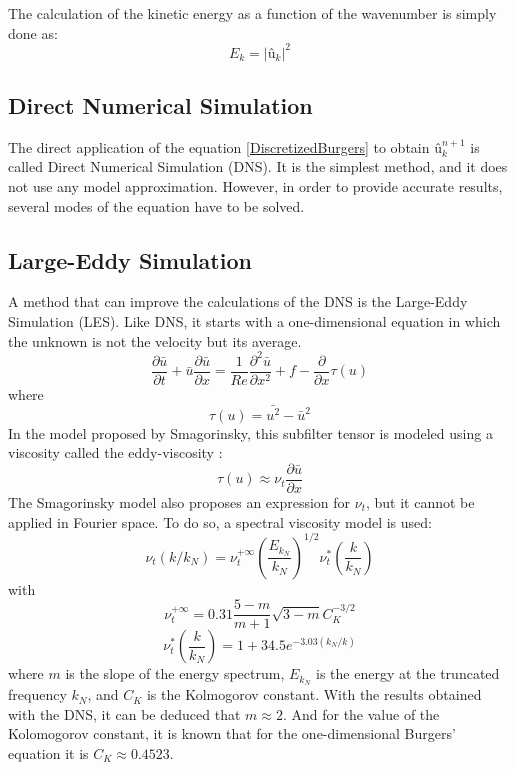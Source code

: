 The calculation of the kinetic energy as a function of the wavenumber is simply done as:
\begin{equation}
E_{k}=|û_{k}|^{2}
\end{equation}

\subsection{Direct Numerical Simulation}
The direct application of the equation \ref{DiscretizedBurgers} to obtain $û_{k}^{n+1}$ is called Direct Numerical Simulation (DNS). It is the simplest method, and it does not use any model approximation. However, in order to provide accurate results, several modes of the equation have to be solved.

\subsection{Large-Eddy Simulation}
A method that can improve the calculations of the DNS is the Large-Eddy Simulation (LES). Like DNS, it starts with a one-dimensional equation in which the unknown is not the velocity but its average.
\begin{equation}
\frac{\partial\bar{u}}{\partial t}+\bar{u}\frac{\partial\bar{u}}{\partial x}=\frac{1}{Re}\frac{\partial^{2}\bar{u}}{\partial x^{2}}+f-\frac{\partial}{\partial x}\tau\left(u\right)
\end{equation}
where
\begin{equation}
\tau\left(u\right)=\bar{u^{2}}-\bar{u}^{2}
\end{equation}
In the model proposed by Smagorinsky, this subfilter tensor is modeled using a viscosity called the eddy-viscosity \cite{CTTC2014}:
\begin{equation}
\tau\left(u\right)\approx\nu_{t}\frac{\partial\bar{u}}{\partial x}
\end{equation}
The Smagorinsky model also proposes an expression for $\nu_{t}$, but it cannot be applied in Fourier space. To do so, a spectral viscosity model is used:
\begin{equation}
\nu_{t}\left(k/k_{N}\right)=\nu_{t}^{+\infty}\left(\frac{E_{k_{N}}}{k_{N}}\right)^{1/2}\nu_{t}^{*}\left(\frac{k}{k_N}\right)
\end{equation}
with
\begin{equation}
\nu_{t}^{+\infty}=0.31\frac{5-m}{m+1}\sqrt{3-m}C_{K}^{-3/2}
\end{equation}
\begin{equation}
\nu_{t}^{*}\left(\frac{k}{k_{N}}\right)=1+34.5e^{-3.03\left(k_N/k\right)}
\end{equation}
where $m$ is the slope of the energy spectrum, $E_{k_{N}}$ is the energy at the truncated frequency $k_{N}$, and $C_{K}$ is the Kolmogorov constant. With the results obtained with the DNS, it can be deduced that $m\approx2$. And for the value of the Kolomogorov constant, it is known that for the one-dimensional Burgers' equation it is $C_{K}\approx0.4523$.

